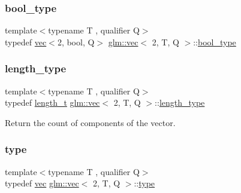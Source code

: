 \subsubsection{\texorpdfstring{bool\+\_\+type}{bool\_type}}
{\footnotesize\ttfamily template$<$typename T , qualifier Q$>$ \\
typedef \hyperlink{structglm_1_1vec}{vec}$<$2, bool, Q$>$ \hyperlink{structglm_1_1vec}{glm\+::vec}$<$ 2, T, Q $>$\+::\hyperlink{structglm_1_1vec_3_012_00_01_t_00_01_q_01_4_a69145b83aafbff09d5d187089564c46f}{bool\+\_\+type}}

\mbox{\label{structglm_1_1vec_3_012_00_01_t_00_01_q_01_4_af8b652526ec88c8513b2a8c05bf92441}} 
\subsubsection{\texorpdfstring{length\+\_\+type}{length\_type}}
{\footnotesize\ttfamily template$<$typename T , qualifier Q$>$ \\
typedef \hyperlink{namespaceglm_a090a0de2260835bee80e71a702492ed9}{length\+\_\+t} \hyperlink{structglm_1_1vec}{glm\+::vec}$<$ 2, T, Q $>$\+::\hyperlink{structglm_1_1vec_3_012_00_01_t_00_01_q_01_4_af8b652526ec88c8513b2a8c05bf92441}{length\+\_\+type}}



Return the count of components of the vector. 

\mbox{\label{structglm_1_1vec_3_012_00_01_t_00_01_q_01_4_a2734b4716ffba77d4ce4cc866cb31d3f}} 
\subsubsection{\texorpdfstring{type}{type}}
{\footnotesize\ttfamily template$<$typename T , qualifier Q$>$ \\
typedef \hyperlink{structglm_1_1vec}{vec} \hyperlink{structglm_1_1vec}{glm\+::vec}$<$ 2, T, Q $>$\+::\hyperlink{structglm_1_1vec_3_012_00_01_t_00_01_q_01_4_a2734b4716ffba77d4ce4cc866cb31d3f}{type}}

